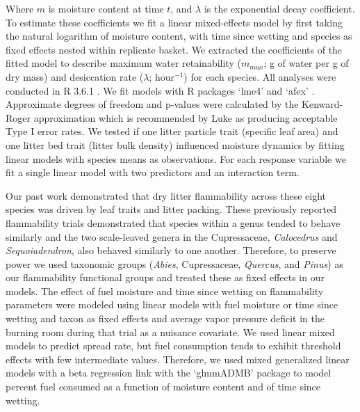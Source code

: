 \documentclass[letterpaper,12pt]{article}
\begin{document}
Where $m$ is moisture content at time $t$, and $\lambda$ is the exponential
decay coefficient. To estimate these coefficients we fit a linear mixed-effects
model by first taking the natural logarithm of moisture content, with time
since wetting and species as fixed effects nested within replicate basket. We
extracted the coefficients of the fitted model to describe maximum water
retainability ($m_{max}$; g of water per g of dry mass) and desiccation rate
($\lambda$; hour$^{-1}$) for each species. All analyses were conducted in R
3.6.1 \citep{RCoreTeam-2019}. We fit models with R packages `lme4'
\citep{Bates_Machler_etal-2015} and `afex' \citep{Singmann_Bolker_etal-2017}.
Approximate degrees of freedom and p-values were calculated by the
Kenward-Roger approximation \citep{Kenward_Roger-1997} which is recommended by
Luke \citeyear{Luke-2017} as producing acceptable Type I error rates. We tested
if one litter particle trait (specific leaf area) and one litter bed trait
(litter bulk density) influenced moisture dynamics by fitting linear models
with species means as observations. For each response variable we fit a single
linear model with two predictors and an interaction term.

Our past work \citep{Magalhaes+Schwilk-2012} demonstrated that dry litter
flammability across these eight species was driven by leaf traits and litter
packing. These previously reported flammability trials demonstrated that
species within a genus tended to behave similarly and the two scale-leaved
genera in the Cupressaceae, \emph{Calocedrus} and \emph{Sequoiadendron}, also
behaved similarly to one another. Therefore, to preserve power we used
taxonomic groups (\emph{Abies}, Cupressaceae, \emph{Quercus}, and \emph{Pinus})
as our flammability functional groups and treated these as fixed effects in our
models. The effect of fuel moisture and time since wetting on flammability
parameters were modeled using linear models with fuel moisture or time since
wetting and taxon as fixed effects and average vapor pressure deficit in the
burning room during that trial as a nuisance covariate. We used linear mixed
models to predict spread rate, but fuel consumption tends to exhibit threshold
effects with few intermediate values. Therefore, we used mixed generalized
linear models with a beta regression link with the `glmmADMB' package
\citep{Skaug_Fournier_etal-2016} to model percent fuel consumed as a function
of moisture content and of time since wetting.
\end{document}
